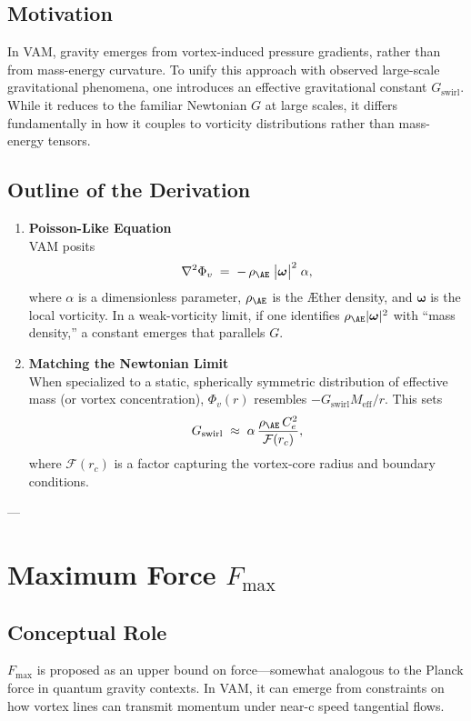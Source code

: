 \subsection{Motivation}
In VAM, gravity emerges from vortex-induced pressure gradients, rather than from mass-energy curvature. To unify this approach with observed large-scale gravitational phenomena, one introduces an effective gravitational constant \(G_{\text{swirl}}\). While it reduces to the familiar Newtonian \(G\) at large scales, it differs fundamentally in how it couples to vorticity distributions rather than mass-energy tensors.

\subsection{Outline of the Derivation}
\begin{enumerate}
    \item \textbf{Poisson-Like Equation} \\
    VAM posits
    \[
        \nabla^2 \Phi_v
        \;=\;
        -\,\rho_{\mathrm{\AE}}\;\bigl|\boldsymbol{\omega}\bigr|^2 \; \alpha,
    \]
    where \(\alpha\) is a dimensionless parameter, \(\rho_{\mathrm{\AE}}\) is the Æther density, and \(\boldsymbol{\omega}\) is the local vorticity. In a weak-vorticity limit, if one identifies \(\rho_{\mathrm{\AE}} |\boldsymbol{\omega}|^2\) with “mass density,” a constant emerges that parallels \(G\).

    \item \textbf{Matching the Newtonian Limit} \\
    When specialized to a static, spherically symmetric distribution of effective mass (or vortex concentration), \(\Phi_v(r)\) resembles \(-G_{\text{swirl}} M_{\text{eff}}/r\). This sets
    \[
        G_{\text{swirl}}
        \;\approx\;
        \alpha \,\frac{\rho_{\mathrm{\AE}}\,C_e^2}{\mathcal{F}(r_c)},
    \]
    where \(\mathcal{F}(r_c)\) is a factor capturing the vortex-core radius and boundary conditions.
\end{enumerate}

---

\section{Maximum Force \(F_{\max}\)}

\subsection{Conceptual Role}
\(F_{\max}\) is proposed as an upper bound on force—somewhat analogous to the Planck force in quantum gravity contexts. In VAM, it can emerge from constraints on how vortex lines can transmit momentum under near-c speed tangential flows.

